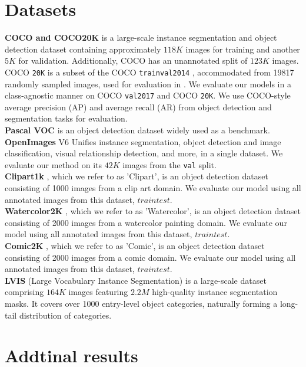 \section{Datasets}
\textbf{COCO and COCO20K} \cite{lin2014microsoft} is a large-scale instance segmentation and object detection dataset containing approximately $118K$ images for training and another $5K$ for validation. Additionally, COCO has an unannotated split of $123K$ images. 
COCO \texttt{20K} is a subset of the COCO \texttt{trainval2014} \cite{lin2014microsoft},
accommodated from 19817 randomly sampled images, used for evaluation in \cite{simeoni2021localizing, vo2020toward, wang2022tokencut, wang2023cut}. We evaluate our models in a class-agnostic manner on COCO \texttt{val2017} and COCO \texttt{20K}. We use COCO-style average precision (AP) and average recall (AR) from object detection and segmentation tasks for evaluation.
\\
\textbf{Pascal VOC} \cite{everingham2010pascal} 
is an object detection dataset widely used as a benchmark.  
\\
\textbf{OpenImages} V6 \cite{kuznetsova2020open}
Unifies instance segmentation, object detection and image classification, visual relationship detection, and more, in a single dataset. We evaluate our method on its $42K$ images from the \texttt{val} split. 
\\
\textbf{Clipart1k} \cite{inoue2018cross}
, which we refer to as 'Clipart', is an object detection dataset consisting of 1000 images from a clip art domain. We evaluate our model using all annotated images from this dataset, $traintest$.
\\
\textbf{Watercolor2K} \cite{inoue2018cross}
, which we refer to as 'Watercolor', is an object detection dataset consisting of 2000 images from a watercolor painting domain. We evaluate our model using all annotated images from this dataset, $traintest$.
\\
\textbf{Comic2K} \cite{inoue2018cross}
, which we refer to as 'Comic', is an object detection dataset consisting of 2000 images from a comic domain. We evaluate our model using all annotated images from this dataset, $traintest$.
\\
\textbf{LVIS} \cite{gupta2019lvis} (Large Vocabulary Instance Segmentation) is a large-scale dataset comprising $164K$ images featuring $2.2M$ high-quality instance segmentation masks. It covers over 1000 entry-level object categories, naturally forming a long-tail distribution of categories.

\section{Addtinal results}

